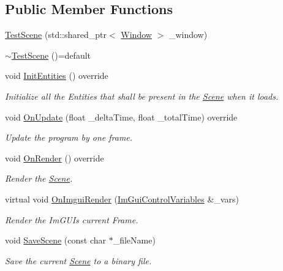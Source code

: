 \subsection*{Public Member Functions}
\begin{DoxyCompactItemize}
\item 
\mbox{\hyperlink{classpiolot_1_1_test_scene_a1568f961f1632ccb9da36d14c6aae0d5}{Test\+Scene}} (std\+::shared\+\_\+ptr$<$ \mbox{\hyperlink{class_window}{Window}} $>$ \+\_\+window)
\item 
\mbox{\hyperlink{classpiolot_1_1_test_scene_a615e7e4264391f122ffdf0f997c825f4}{$\sim$\+Test\+Scene}} ()=default
\item 
void \mbox{\hyperlink{classpiolot_1_1_test_scene_a76c03545ecd764cd4350eec338c9a94e}{Init\+Entities}} () override
\begin{DoxyCompactList}\small\item\em Initialize all the Entities that shall be present in the \mbox{\hyperlink{classpiolot_1_1_scene}{Scene}} when it loads. \end{DoxyCompactList}\item 
void \mbox{\hyperlink{classpiolot_1_1_test_scene_a1151c075257a2b626774502709e0aab9}{On\+Update}} (float \+\_\+delta\+Time, float \+\_\+total\+Time) override
\begin{DoxyCompactList}\small\item\em Update the program by one frame. \end{DoxyCompactList}\item 
void \mbox{\hyperlink{classpiolot_1_1_test_scene_aeaccbb83f264fb4f1e8df5b246033f76}{On\+Render}} () override
\begin{DoxyCompactList}\small\item\em Render the \mbox{\hyperlink{classpiolot_1_1_scene}{Scene}}. \end{DoxyCompactList}\item 
virtual void \mbox{\hyperlink{classpiolot_1_1_test_scene_aa75a09c9c598fc35949f097cbb6df5cb}{On\+Imgui\+Render}} (\mbox{\hyperlink{structpiolot_1_1_im_gui_control_variables}{Im\+Gui\+Control\+Variables}} \&\+\_\+vars)
\begin{DoxyCompactList}\small\item\em Render the Im\+G\+UI\textquotesingle{}s current Frame. \end{DoxyCompactList}\item 
void \mbox{\hyperlink{classpiolot_1_1_test_scene_a8fcd4f46ccdb6c49741bb37364d9bb0e}{Save\+Scene}} (const char $\ast$\+\_\+file\+Name)
\begin{DoxyCompactList}\small\item\em Save the current \mbox{\hyperlink{classpiolot_1_1_scene}{Scene}} to a binary file. \end{DoxyCompactList}\item 

\end{DoxyCompactItemize}

